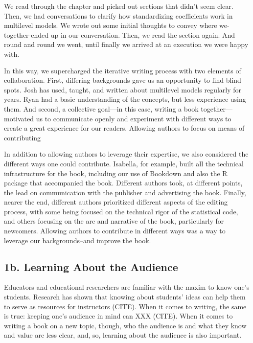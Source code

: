 \documentclass[
  english,
  man]{apa6}
\begin{document}
We read through the chapter and picked out sections that didn't seem clear. Then, we had conversations to clarify how standardizing coefficients work in multilevel models. We wrote out some initial thoughts to convey where we-together-ended up in our conversation. Then, we read the section again. And round and round we went, until finally we arrived at an execution we were happy with.

In this way, we supercharged the iterative writing process with two elements of collaboration. First, differing backgrounds gave us an opportunity to find blind spots. Josh has used, taught, and written about multilevel models regularly for years. Ryan had a basic understanding of the concepts, but less experience using them. And second, a collective goal---in this case, writing a book together---motivated us to communicate openly and experiment with different ways to create a great experience for our readers.
Allowing authors to focus on means of contributing

In addition to allowing authors to leverage their expertise, we also considered the different ways one could contribute. Isabella, for example, built all the technical infrastructure for the book, including our use of Bookdown and also the R package that accompanied the book. Different authors took, at different points, the lead on communication with the publisher and advertising the book. Finally, nearer the end, different authors prioritized different aspects of the editing process, with some being focused on the technical rigor of the statistical code, and others focusing on the arc and narrative of the book, particularly for newcomers. Allowing authors to contribute in different ways was a way to leverage our backgrounds--and improve the book.

\hypertarget{b.-learning-about-the-audience}{%
\subsection{1b. Learning About the Audience}\label{b.-learning-about-the-audience}}

Educators and educational researchers are familiar with the maxim to know one's students. Research has shown that knowing about students' ideas can help them to serve as resources for instructors (CITE). When it comes to writing, the same is true: keeping one's audience in mind can XXX (CITE). When it comes to writing a book on a new topic, though, who the audience is and what they know and value are less clear, and, so, learning about the audience is also important.
\end{document}
